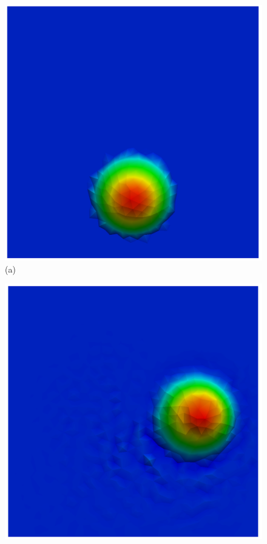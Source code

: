 \begin{figure}[H]
     \centering
     \begin{minipage}{.5\linewidth}
      \centering
      \includegraphics[scale=0.2]{./02_chaps/cap_validation/figure/taylor_0.png}\\
      (a)
     \end{minipage}%
     \begin{minipage}{.5\linewidth}
      \centering
      \includegraphics[scale=0.2]{./02_chaps/cap_validation/figure/taylor_300.png}\\

\end{minipage}
\end{figure}
